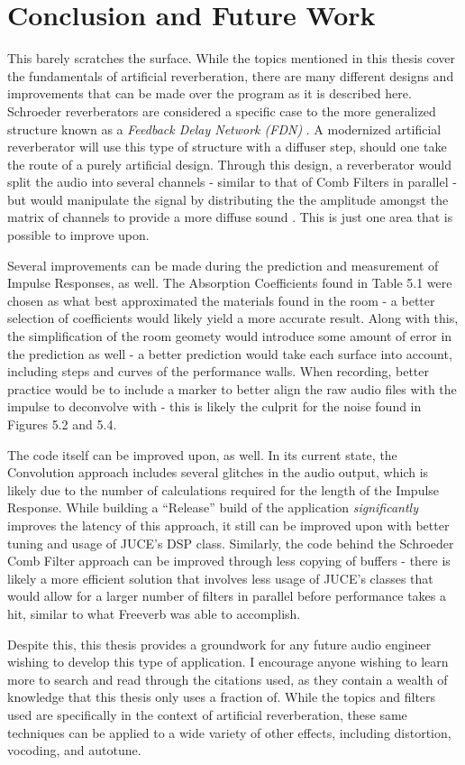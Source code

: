 \chapter{Conclusion and Future Work}
\hspace*{-0.15cm}This barely scratches the surface. While the topics mentioned in this thesis cover the fundamentals of artificial reverberation, there are many different designs and improvements that can be made over the program as it is described here. Schroeder reverberators are considered a specific case to the more generalized structure known as a \textit{Feedback Delay Network (FDN)} \cite{schlecht2016lossless}. A modernized artificial reverberator will use this type of structure with a diffuser step, should one take the route of a purely artificial design. Through this design, a reverberator would split the audio into several channels - similar to that of Comb Filters in parallel - but would manipulate the signal by distributing the the amplitude amongst the matrix of channels to provide a more diffuse sound \cite{writeReverb}. This is just one area that is possible to improve upon.

Several improvements can be made during the prediction and measurement of Impulse Responses, as well. The Absorption Coefficients found in Table 5.1 were chosen as what best approximated the materials found in the room - a better selection of coefficients would likely yield a more accurate result. Along with this, the simplification of the room geomety would introduce some amount of error in the prediction as well - a better prediction would take each surface into account, including steps and curves of the performance walls. When recording, better practice would be to include a marker to better align the raw audio files with the impulse to deconvolve with - this is likely the culprit for the noise found in Figures 5.2 and 5.4.

The code itself can be improved upon, as well. In its current state, the Convolution approach includes several glitches in the audio output, which is likely due to the number of calculations required for the length of the Impulse Response. While building a ``Release'' build of the application \textit{significantly} improves the latency of this approach, it still can be improved upon with better tuning and usage of JUCE's DSP class. Similarly, the code behind the Schroeder Comb Filter approach can be improved through less copying of buffers - there is likely a more efficient solution that involves less usage of JUCE's classes that would allow for a larger number of filters in parallel before performance takes a hit, similar to what Freeverb was able to accomplish.

Despite this, this thesis provides a groundwork for any future audio engineer wishing to develop this type of application. I encourage anyone wishing to learn more to search and read through the citations used, as they contain a wealth of knowledge that this thesis only uses a fraction of. While the topics and filters used are specifically in the context of artificial reverberation, these same techniques can be applied to a wide variety of other effects, including distortion, vocoding, and autotune.
